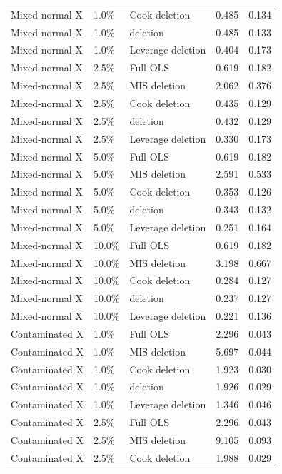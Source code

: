 \begin{table}[htbp]
{\begin{tabular}{@{}lllrr@{}}
Mixed-normal X & 1.0\% & Cook deletion & 0.485 & 0.134 \\
Mixed-normal X & 1.0\% & \dfbetas{} deletion & 0.485 & 0.133 \\
Mixed-normal X & 1.0\% & Leverage deletion & 0.404 & 0.173 \\
\addlinespace
Mixed-normal X & 2.5\% & Full OLS & 0.619 & 0.182 \\
Mixed-normal X & 2.5\% & MIS deletion & 2.062 & 0.376 \\
Mixed-normal X & 2.5\% & Cook deletion & 0.435 & 0.129 \\
Mixed-normal X & 2.5\% & \dfbetas{} deletion & 0.432 & 0.129 \\
Mixed-normal X & 2.5\% & Leverage deletion & 0.330 & 0.173 \\
\addlinespace
Mixed-normal X & 5.0\% & Full OLS & 0.619 & 0.182 \\
Mixed-normal X & 5.0\% & MIS deletion & 2.591 & 0.533 \\
Mixed-normal X & 5.0\% & Cook deletion & 0.353 & 0.126 \\
Mixed-normal X & 5.0\% & \dfbetas{} deletion & 0.343 & 0.132 \\
Mixed-normal X & 5.0\% & Leverage deletion & 0.251 & 0.164 \\
\addlinespace
Mixed-normal X & 10.0\% & Full OLS & 0.619 & 0.182 \\
Mixed-normal X & 10.0\% & MIS deletion & 3.198 & 0.667 \\
Mixed-normal X & 10.0\% & Cook deletion & 0.284 & 0.127 \\
Mixed-normal X & 10.0\% & \dfbetas{} deletion & 0.237 & 0.127 \\
Mixed-normal X & 10.0\% & Leverage deletion & 0.221 & 0.136 \\
\addlinespace
Contaminated X & 1.0\% & Full OLS & 2.296 & 0.043 \\
Contaminated X & 1.0\% & MIS deletion & 5.697 & 0.044 \\
Contaminated X & 1.0\% & Cook deletion & 1.923 & 0.030 \\
Contaminated X & 1.0\% & \dfbetas{} deletion & 1.926 & 0.029 \\
Contaminated X & 1.0\% & Leverage deletion & 1.346 & 0.046 \\
\addlinespace
Contaminated X & 2.5\% & Full OLS & 2.296 & 0.043 \\
Contaminated X & 2.5\% & MIS deletion & 9.105 & 0.093 \\
Contaminated X & 2.5\% & Cook deletion & 1.988 & 0.029 \\

\end{tabular}}
\end{table}
